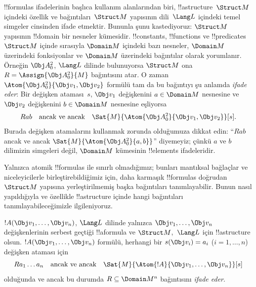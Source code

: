 



\begin{explain}
!!{formula}s ifadelerinin başlıca kullanım alanlarından biri,
!!a{structure}~$\Struct M$ içindeki özellik ve bağıntıları~$\Struct
M$ yapısının dili~$\Lang L$ içindeki temel simgeler cinsinden ifade
etmektir. Bununla şunu kastediyoruz: $\Struct M$ yapısının !!{domain}
bir nesneler kümesidir. !!{constant}s, !!{function}s ve !!{predicate}s
$\Struct M$ içinde sırasıyla $\Domain M$ içindeki bazı nesneler,
$\Domain M$ üzerindeki fonksiyonlar ve $\Domain M$ üzerindeki
bağıntılar olarak yorumlanır. Örneğin $\Obj A^2_0$, $\Lang L$ dilinde
bulunuyorsa $\Struct M$ ona $R=\Assign{{\Obj A^2_0}}{M}$ bağıntısını
atar. O zaman $\Atom{\Obj A^2_0}{\Obj v_1,\Obj v_2}$ formülü tam da
bu bağıntıyı şu anlamda \emph{ifade eder}: Bir değişken ataması~$s$,
$\Obj v_1$ değişkenini $a\in\Domain M$ nesnesine ve $\Obj v_2$
değişkenini $b\in\Domain M$ nesnesine eşliyorsa
\[
Rab \text{\quad ancak ve ancak\quad}
\Sat{M}{\Atom{\Obj A^2_0}{\Obj v_1, \Obj v_2}}[s].
\]
Burada değişken atamalarını kullanmak zorunda olduğumuza dikkat edin:
``$Rab$ ancak ve ancak $\Sat{M}{\Atom{\Obj A^2_0}{a,b}}$''
diyemeyiz; çünkü $a$ ve $b$ dilimizin simgeleri değil,
$\Domain M$ kümesinin !!{element}s ifadeleridir.

Yalnızca atomik !!{formula}s ile sınırlı olmadığımız; bunları mantıksal
bağlaçlar ve niceleyicilerle birleştirebildiğimiz için, daha karmaşık
!!{formula}s doğrudan $\Struct M$ yapısına yerleştirilmemiş başka
bağıntıları tanımlayabilir. Bunun nasıl yapıldığıyla ve özellikle
!!a{structure} içinde hangi bağıntıları tanımlayabileceğimizle
ilgileniyoruz.
\end{explain}

\begin{defn}
$!A(\Obj v_1,\dots,\Obj v_n)$, $\Lang L$ dilinde yalnızca
$\Obj v_1,\dots,\Obj v_n$ değişkenlerinin serbest geçtiği !!a{formula}
ve $\Struct M$,~$\Lang L$ için !!a{structure} olsun.
$!A(\Obj v_1,\dots,\Obj v_n)$ formülü, herhangi bir $s(\Obj v_i)=a_i$
($i=1,\dots,n$) değişken ataması için
\[
Ra_1\dots a_n \text{\quad ancak ve ancak\quad}
\Sat{M}{\Atom{!A}{\Obj v_1,\dots, \Obj v_n}}[s]
\]
olduğunda ve ancak bu durumda $R\subseteq\Domain M^n$ bağıntısını
\emph{ifade eder}.
\end{defn}

